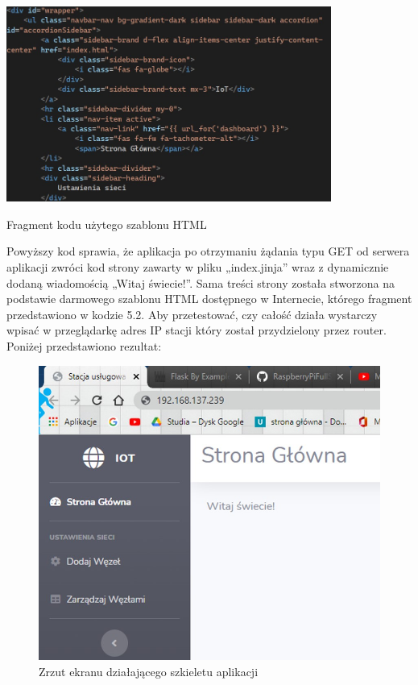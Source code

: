 \documentclass[12pt, twoside, openany]{mwrep}
\begin{document}
\begin{algorithm}[H]
\centering
\includegraphics[width=0.8\textwidth]{kod_html}
\caption{Fragment kodu użytego szablonu HTML}
\end{algorithm}

Powyższy kod sprawia, że aplikacja po otrzymaniu żądania typu GET od serwera aplikacji zwróci kod strony zawarty w pliku „index.jinja” wraz z dynamicznie dodaną wiadomością „Witaj świecie!”. Sama treści strony została stworzona na podstawie darmowego szablonu HTML dostępnego w Internecie, którego fragment przedstawiono w kodzie 5.2.  Aby przetestować, czy całość działa wystarczy wpisać w przeglądarkę adres IP stacji który został przydzielony przez router. Poniżej przedstawiono rezultat:
\begin{figure}[H]
\centering
\includegraphics[width=\textwidth]{szkielet}
\caption{Zrzut ekranu działającego szkieletu aplikacji}
\end{figure}
\end{document}
